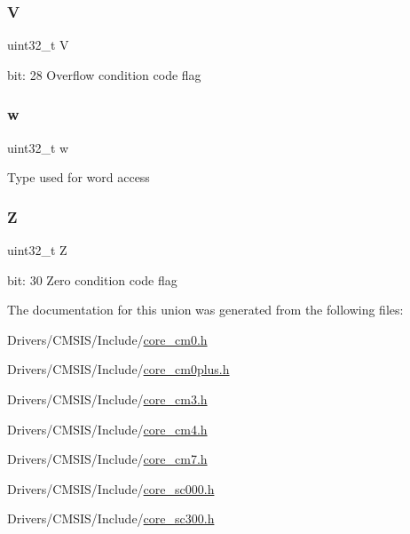 \subsubsection{\texorpdfstring{V}{V}}
{\footnotesize\ttfamily uint32\+\_\+t V}

bit\+: 28 Overflow condition code flag \mbox{\label{union_a_p_s_r___type_ad0fb62e7a08e70fc5e0a76b67809f84b}} 
\subsubsection{\texorpdfstring{w}{w}}
{\footnotesize\ttfamily uint32\+\_\+t w}

Type used for word access \mbox{\label{union_a_p_s_r___type_a5ae954cbd9986cd64625d7fa00943c8e}} 
\subsubsection{\texorpdfstring{Z}{Z}}
{\footnotesize\ttfamily uint32\+\_\+t Z}

bit\+: 30 Zero condition code flag 

The documentation for this union was generated from the following files\+:\begin{DoxyCompactItemize}
\item 
Drivers/\+C\+M\+S\+I\+S/\+Include/\mbox{\hyperlink{core__cm0_8h}{core\+\_\+cm0.\+h}}\item 
Drivers/\+C\+M\+S\+I\+S/\+Include/\mbox{\hyperlink{core__cm0plus_8h}{core\+\_\+cm0plus.\+h}}\item 
Drivers/\+C\+M\+S\+I\+S/\+Include/\mbox{\hyperlink{core__cm3_8h}{core\+\_\+cm3.\+h}}\item 
Drivers/\+C\+M\+S\+I\+S/\+Include/\mbox{\hyperlink{core__cm4_8h}{core\+\_\+cm4.\+h}}\item 
Drivers/\+C\+M\+S\+I\+S/\+Include/\mbox{\hyperlink{core__cm7_8h}{core\+\_\+cm7.\+h}}\item 
Drivers/\+C\+M\+S\+I\+S/\+Include/\mbox{\hyperlink{core__sc000_8h}{core\+\_\+sc000.\+h}}\item 
Drivers/\+C\+M\+S\+I\+S/\+Include/\mbox{\hyperlink{core__sc300_8h}{core\+\_\+sc300.\+h}}\end{DoxyCompactItemize}
